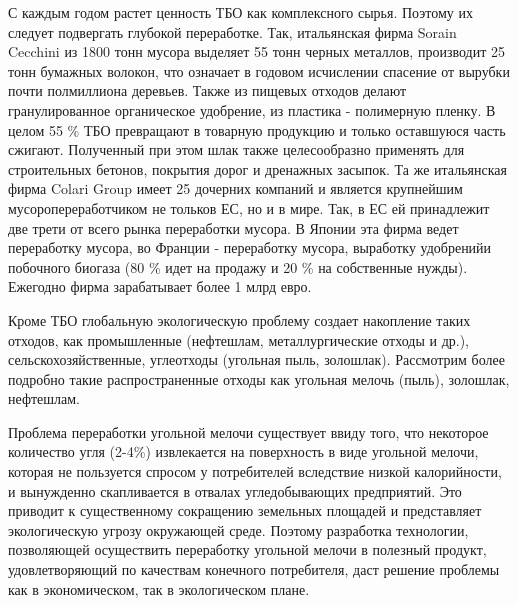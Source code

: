 С каждым годом растет ценность ТБО как комплексного сырья. Поэтому их
следует подвергать глубокой переработке. Так, итальянская фирма Sorain
Cecchini из 1800 тонн мусора выделяет 55 тонн черных металлов,
производит 25 тонн бумажных волокон, что означает в годовом исчислении
спасение от вырубки почти полмиллиона деревьев. Также из пищевых отходов
делают гранулированное органическое удобрение, из пластика - полимерную
пленку. В целом 55 \% ТБО превращают в товарную продукцию и только
оставшуюся часть сжигают. Полученный при этом шлак также целесообразно
применять для строительных бетонов, покрытия дорог и дренажных засыпок.
Та же итальянская фирма Colari Group имеет 25 дочерних компаний и
является крупнейшим мусоропереработчиком не тольков ЕС, но и в мире.
Так, в ЕС ей принадлежит две трети от всего рынка переработки мусора. В
Японии эта фирма ведет переработку мусора, во Франции - переработку
мусора, выработку удобренийи побочного биогаза (80 \% идет на продажу и
20 \% на собственные нужды). Ежегодно фирма зарабатывает более 1 млрд
евро.

Кроме ТБО глобальную экологическую проблему создает накопление таких
отходов, как промышленные (нефтешлам, металлургические отходы и др.),
сельскохозяйственные, углеотходы (угольная пыль, золошлак). Рассмотрим
более подробно такие распространенные отходы как угольная мелочь (пыль),
золошлак, нефтешлам.

Проблема переработки угольной мелочи существует ввиду того, что
некоторое количество угля (2-4\%) извлекается на поверхность в виде
угольной мелочи, которая не пользуется спросом у потребителей вследствие
низкой калорийности, и вынужденно скапливается в отвалах угледобывающих
предприятий. Это приводит к существенному сокращению земельных площадей
и представляет экологическую угрозу окружающей среде. Поэтому разработка
технологии, позволяющей осуществить переработку угольной мелочи в
полезный продукт, удовлетворяющий по качествам конечного потребителя,
даст решение проблемы как в экономическом, так в экологическом плане.

